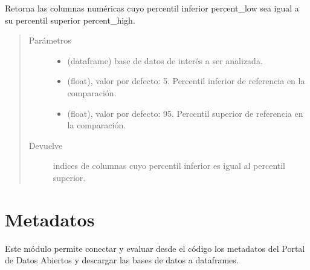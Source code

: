 \documentclass[letterpaper,10pt,openany,spanish]{sphinxmanual}
\begin{document}
\begin{fulllineitems}
\label{\detokenize{datos:datos.varianza_percentil}}
Retorna las columnas numéricas cuyo percentil inferior percent\_low sea igual a su percentil superior percent\_high.
\begin{quote}\begin{description}
\item[{Parámetros}] \leavevmode\begin{itemize}
\item {} 
 \textendash{} (dataframe) base de datos de interés a ser analizada.

\item {} 
 \textendash{} (float), valor por defecto: 5. Percentil inferior de referencia en la comparación.

\item {} 
 \textendash{} (float), valor por defecto: 95. Percentil superior de referencia en la comparación.

\end{itemize}

\item[{Devuelve}] \leavevmode
indices de columnas cuyo percentil inferior es igual al percentil superior.

\end{description}\end{quote}

\end{fulllineitems}



\chapter{Metadatos}
\label{\detokenize{metadatos:metadatos}}\label{\detokenize{metadatos:id1}}\label{\detokenize{metadatos::doc}}
Este módulo permite conectar y evaluar desde el código los metadatos del Portal de Datos Abiertos y descargar las bases de datos a dataframes.
\end{document}
